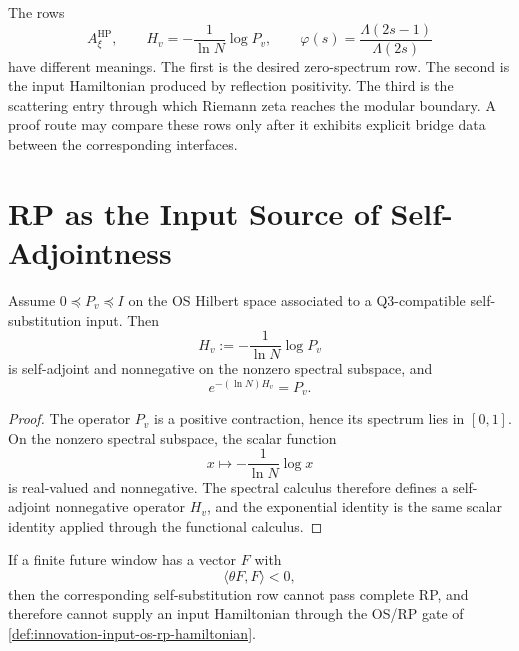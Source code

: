 \begin{principle}
\label{prin:innovation-input-operator-rows-not-interchangeable}
The rows
$$
A_{\xi}^{\mathrm{HP}},
\qquad
H_v=-\frac1{\ln N}\log P_v,
\qquad
\varphi(s)=\frac{\Lambda(2s-1)}{\Lambda(2s)}
$$
have different meanings. The first is the desired zero-spectrum row. The
second is the input Hamiltonian produced by reflection positivity. The
third is the scattering entry through which Riemann zeta reaches the
modular boundary. A proof route may compare these rows only after it
exhibits explicit bridge data between the corresponding interfaces.
\end{principle}


\section{RP as the Input Source of Self-Adjointness}
\label{sec:innovation-input-rp-source-self-adjointness}

\begin{theorem}
\label{thm:innovation-input-positive-transition-gives-hamiltonian}
Assume $0\preceq P_v\preceq I$ on the OS Hilbert space associated to a
Q3-compatible self-substitution input. Then
$$
H_v:=-\frac1{\ln N}\log P_v
$$
is self-adjoint and nonnegative on the nonzero spectral subspace, and
$$
e^{-(\ln N)H_v}=P_v.
$$
\end{theorem}

\begin{proof}
The operator $P_v$ is a positive contraction, hence its spectrum lies in
$[0,1]$. On the nonzero spectral subspace, the scalar function
$$
x\mapsto -\frac1{\ln N}\log x
$$
is real-valued and nonnegative. The spectral calculus therefore defines a
self-adjoint nonnegative operator $H_v$, and the exponential identity is
the same scalar identity applied through the functional calculus.
\end{proof}

\begin{corollary}
\label{cor:innovation-input-finite-window-failure-blocks-hamiltonian-gate}
If a finite future window has a vector $F$ with
$$
\langle\theta F,F\rangle<0,
$$
then the corresponding self-substitution row cannot pass complete RP, and
therefore cannot supply an input Hamiltonian through the OS/RP gate of
\autoref{def:innovation-input-os-rp-hamiltonian}.
\end{corollary}

